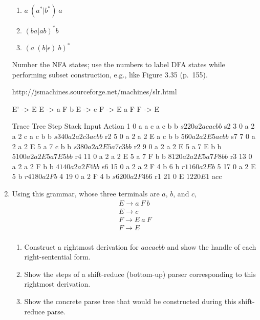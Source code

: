 \documentclass[twocolumn,letterpaper]{article}
\begin{document}
\begin{enumerate}
\begin{enumerate}
\item $a\ (a^* | b^*)\ a$
\item $(ba | ab)^* b$
\item $(a\ (b | \epsilon)\ b)^*$
\end{enumerate}

Number the NFA states; use the numbers to label DFA states while
performing subset construction, e.g., like Figure 3.35 (p.\ 155).

http://jsmachines.sourceforge.net/machines/slr.html

E' -> E
E -> a F b
E -> c
F -> E a F
F -> E


Trace	Tree
Step	Stack			Input		Action
1	0			a a c a c b b $	s2	
2	0 a 2			a c a c b b $	s2
3	0 a 2 a 2		c a c b b $	s3
4	0 a 2 a 2 c 3		a c b b $	r2
5	0 a 2 a 2 E		a c b b $	5
6	0 a 2 a 2 E 5		a c b b $	s7
7	0 a 2 a 2 E 5 a 7	c b b $		s3
8	0 a 2 a 2 E 5 a 7 c 3	b b $		r2
9	0 a 2 a 2 E 5 a 7 E	b b $		5
10	0 a 2 a 2 E 5 a 7 E 5	b b $		r4
11	0 a 2 a 2 E 5 a 7 F	b b $		8
12	0 a 2 a 2 E 5 a 7 F 8	b b $		r3
13	0 a 2 a 2 F		b b $		4
14	0 a 2 a 2 F 4		b b $		s6
15	0 a 2 a 2 F 4 b 6	b $		r1
16	0 a 2 E			b $		5
17	0 a 2 E 5		b $		r4
18	0 a 2 F			b $		4
19	0 a 2 F 4		b $		s6
20	0 a 2 F 4 b 6		$		r1
21	0 E			$		1
22	0 E 1			$		acc
\fi

\item Using this grammar, whose three terminals are $a$, $b$, and $c$,
\[\begin{array}{l}
E \rightarrow a\ F\ b \\
E \rightarrow c \\
F \rightarrow E\ a\ F \\
F \rightarrow E \\
 \end{array}\]

\begin{enumerate}

\item Construct a rightmost derivation for $a a c a c b b$ and
  show the handle of each right-sentential form.

\item Show the steps of a shift-reduce (bottom-up) parser
  corresponding to this rightmost derivation.

\item Show the concrete parse tree that would be constructed during
  this shift-reduce parse.

\end{enumerate}




\end{enumerate}
\end{document}
